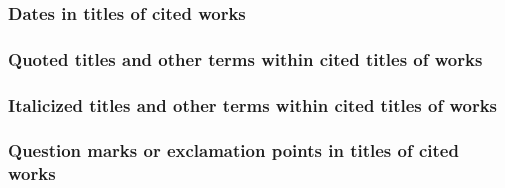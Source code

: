 \documentclass[11pt,letterpaper,oneside]{article}
\begin{document}
\begin{citebib}
\item \cite[104]{maclean1976}
\end{citebib}

\subsubsection{Dates in titles of cited works}

\begin{citebib}
\item \cite{beiser2014}
\end{citebib}

\subsubsection{Quoted titles and other terms within cited titles of works}

\begin{citebib}
\item \cite{levitt2005}
\item \cite{mchugh1980}
\end{citebib}

\subsubsection{Italicized titles and other terms within cited titles of works}

\begin{citebib}
\item \cite{vanwagenen1973}
\end{citebib}

\subsubsection{Question marks or exclamation points in titles of cited works}

\begin{citebib}
\item \cite[63]{berra2002}
\item \cite[183]{oram2007}
\item \cite[778]{tessler2014}
\item \cite[336]{batson1990}
\item \cite[55--56]{berra2002}
\item \cite[184]{oram2007}
\item \cite[780]{tessler2014}
\item \cite[337]{batson1990}
\end{citebib}
\end{document}
